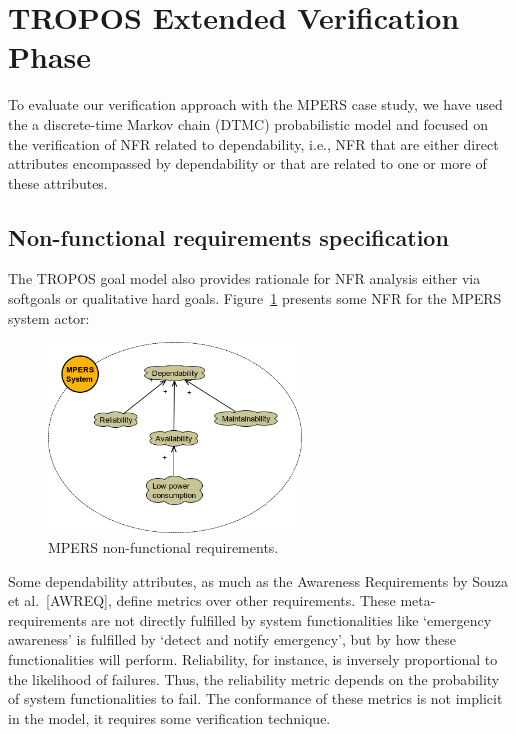 \section{TROPOS Extended Verification Phase}

To evaluate our verification approach with the MPERS case study, we have used the a discrete-time Markov chain (DTMC) probabilistic model and focused on the verification of NFR related to dependability, i.e., NFR that are either direct attributes encompassed by dependability or that are related to one or more of these attributes. 

\subsection{Non-functional requirements specification}

The TROPOS goal model also provides rationale for NFR analysis either via softgoals or qualitative hard goals. Figure~\ref{fig:MPERS_NFR} presents some NFR for the MPERS system actor:

\begin{figure}[h!]
\centering
\includegraphics[width=0.6\textwidth]{imgs/MPERS_NFR.png}
\caption{MPERS non-functional requirements.}
\label{fig:MPERS_NFR}
\end{figure}

Some dependability attributes, as much as the Awareness Requirements by Souza et al.~[AWREQ], define metrics over other requirements. These meta-requirements are not directly fulfilled by system functionalities like `emergency awareness' is fulfilled by `detect and notify emergency', but by how these functionalities will perform. Reliability, for instance, is inversely proportional to the likelihood of failures. Thus, the reliability metric depends on the probability of system functionalities to fail. The conformance of these metrics is not implicit in the model, it requires some verification technique.

